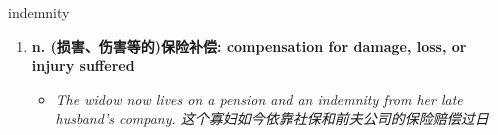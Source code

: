 
\begin{frame}
{\huge indemnity}
\begin{center}
\begin{enumerate}\Large
  \item \textbf{n. (损害、伤害等的)保险补偿: compensation for damage, loss, or injury suffered}
  \begin{itemize}
    \item \em{\Large{The widow now lives on a pension and an indemnity from her late husband's company. 这个寡妇如今依靠社保和前夫公司的保险赔偿过日}}
  \end{itemize}
\end{enumerate}
\end{center}
\end{frame}
